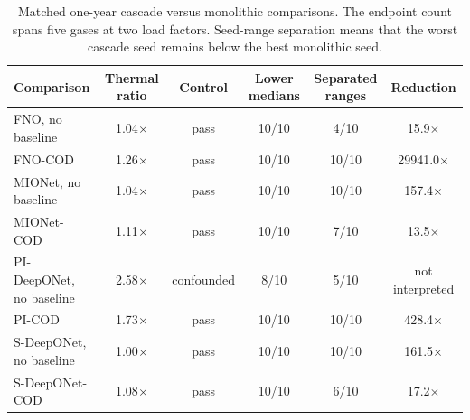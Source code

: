 \begin{table}[t]
\centering
\caption{Matched one-year cascade versus monolithic comparisons. The endpoint count spans five gases at two load factors. Seed-range separation means that the worst cascade seed remains below the best monolithic seed.}
\label{tab:matched_comparisons}
\begin{tabular}{lccccc}
\hline
Comparison & Thermal ratio & Control & Lower medians & Separated ranges & Reduction \\
\hline
FNO, no baseline & 1.04$\times$ & pass & 10/10 & 4/10 & 15.9$\times$ \\
FNO-COD & 1.26$\times$ & pass & 10/10 & 10/10 & 29941.0$\times$ \\
MIONet, no baseline & 1.04$\times$ & pass & 10/10 & 10/10 & 157.4$\times$ \\
MIONet-COD & 1.11$\times$ & pass & 10/10 & 7/10 & 13.5$\times$ \\
PI-DeepONet, no baseline & 2.58$\times$ & confounded & 8/10 & 5/10 & not interpreted \\
PI-COD & 1.73$\times$ & pass & 10/10 & 10/10 & 428.4$\times$ \\
S-DeepONet, no baseline & 1.00$\times$ & pass & 10/10 & 10/10 & 161.5$\times$ \\
S-DeepONet-COD & 1.08$\times$ & pass & 10/10 & 6/10 & 17.2$\times$ \\
\hline
\end{tabular}
\end{table}
